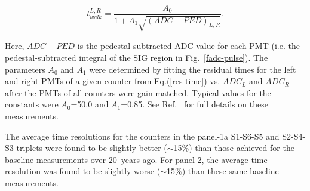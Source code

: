 \documentclass[final,3p,twocolumn]{elsarticle}
\begin{document}
\begin{equation}
\label{walk-function}
t_{walk}^{L,R} = \frac{A_0}{1 + A_1 \sqrt{(ADC - PED)_{L,R}}}.
\end{equation}

\noindent
Here, $ADC - PED$ is the pedestal-subtracted ADC value for each PMT (i.e. the pedestal-subtracted integral
of the SIG region in Fig.~\ref{fadc-pulse}). The parameters $A_0$ and $A_1$ were determined by fitting
the residual times for the left and right PMTs of a given counter from Eq.(\ref{res-time}) vs. $ADC_L$ and
$ADC_R$ after the PMTs of all counters were gain-matched. Typical values for the constants were $A_0$=50.0
and $A_1$=0.85. See Ref.~\cite{dsc-cn2013-001} for full details on these measurements.

The average time resolutions for the counters in the panel-1a S1-S6-S5 and S2-S4-S3 triplets were
found to be slightly better ($\sim$15\%) than those achieved for the baseline measurements over
20~years ago. For panel-2, the average time resolution was found to be slightly worse ($\sim$15\%)
than these same baseline measurements.
\end{document}
